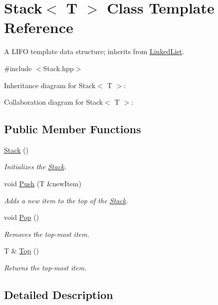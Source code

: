 \hypertarget{classStack}{}\section{Stack$<$ T $>$ Class Template Reference}
\label{classStack}


A L\+I\+FO template data structure; inherits from \hyperlink{classLinkedList}{Linked\+List}.  




{\ttfamily \#include $<$Stack.\+hpp$>$}



Inheritance diagram for Stack$<$ T $>$\+:


Collaboration diagram for Stack$<$ T $>$\+:
\subsection*{Public Member Functions}
\begin{DoxyCompactItemize}
\item 
\hyperlink{classStack_aefee698059467258bbd79045aca62a63}{Stack} ()
\begin{DoxyCompactList}\small\item\em Initializes the \hyperlink{classStack}{Stack}. \end{DoxyCompactList}\item 
void \hyperlink{classStack_a834448898d90c3e34d83cd281f014c29}{Push} (T \&new\+Item)
\begin{DoxyCompactList}\small\item\em Adds a new item to the top of the \hyperlink{classStack}{Stack}. \end{DoxyCompactList}\item 
void \hyperlink{classStack_a197a49c3d95c29649cf35f756999c612}{Pop} ()
\begin{DoxyCompactList}\small\item\em Removes the top-\/most item. \end{DoxyCompactList}\item 
T \& \hyperlink{classStack_a5f32282a27e73107035201f6a5568822}{Top} ()
\begin{DoxyCompactList}\small\item\em Returns the top-\/most item. \end{DoxyCompactList}\end{DoxyCompactItemize}


\subsection{Detailed Description}
